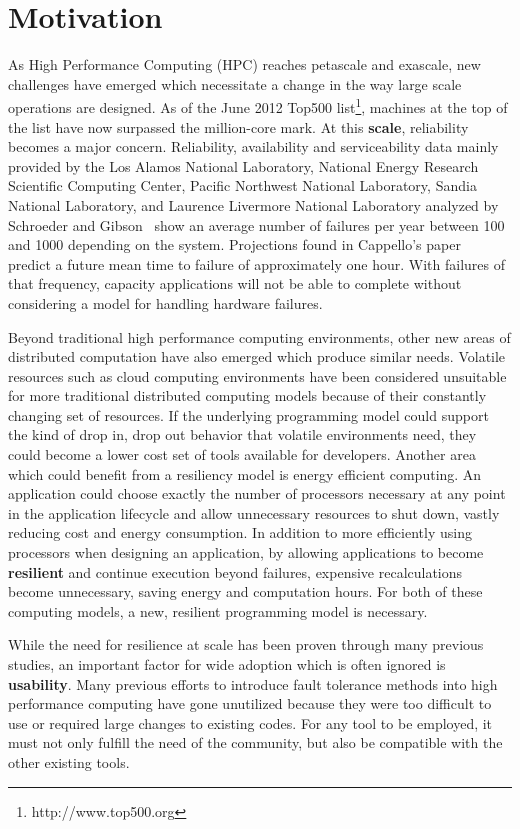 \section{Motivation}\label{sect:motivation}

As High Performance Computing (HPC) reaches petascale and exascale, new
challenges have emerged which necessitate a change in the way large scale
operations are designed. As of the June 2012 Top500
list\footnote{http://www.top500.org}, machines at the top of the list have now
surpassed the million-core mark. At this \textbf{scale}, reliability becomes a
major concern. Reliability, availability and serviceability data mainly provided
by the Los Alamos National Laboratory, National Energy Research Scientific
Computing Center, Pacific Northwest National Laboratory, Sandia National
Laboratory, and Laurence Livermore National Laboratory analyzed by Schroeder and
Gibson~\cite{Schroeder:2007tp} show an average number of failures per year
between 100 and 1000 depending on the system. Projections found in Cappello's
paper~\cite{Cappello:2009dd} predict a future mean time to failure of
approximately one hour. With failures of that frequency, capacity applications
will not be able to complete without considering a model for handling hardware
failures.

Beyond traditional high performance computing environments, other new areas of
distributed computation have also emerged which produce similar needs. Volatile
resources such as cloud computing environments have been considered unsuitable
for more traditional distributed computing models because of their constantly
changing set of resources. If the underlying programming model could support the
kind of drop in, drop out behavior that volatile environments need, they could
become a lower cost set of tools available for developers. Another area which
could benefit from a resiliency model is energy efficient computing. An
application could choose exactly the number of processors necessary at any point
in the application lifecycle and allow unnecessary resources to shut down,
vastly reducing cost and energy consumption. In addition to more efficiently
using processors when designing an application, by allowing applications to
become \textbf{resilient} and continue execution beyond failures, expensive
recalculations become unnecessary, saving energy and computation hours. For both
of these computing models, a new, resilient programming model is necessary.

While the need for resilience at scale has been proven through many previous
studies, an important factor for wide adoption which is often ignored is
\textbf{usability}. Many previous efforts to introduce fault tolerance methods into high
performance computing have gone unutilized because they were too difficult to
use or required large changes to existing codes. For any tool to be employed, it
must not only fulfill the need of the community, but also be compatible with
the other existing tools.

